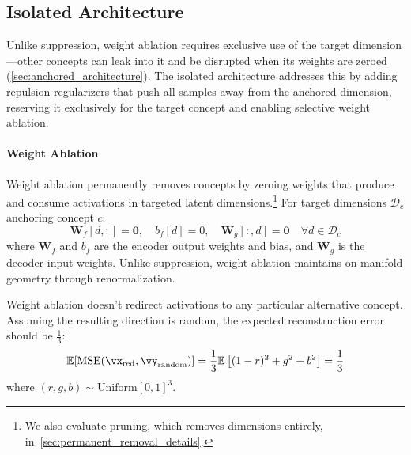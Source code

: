 %

\subsection{Isolated Architecture}
\label{sec:isolated_architecture}

Unlike suppression, weight ablation requires exclusive use of the target dimension---other concepts can leak into it and be disrupted when its weights are zeroed (\cref{sec:anchored_architecture}). The isolated architecture addresses this by adding repulsion regularizers that push all samples away from the anchored dimension, reserving it exclusively for the target concept and enabling selective weight ablation.

\paragraph{Weight Ablation}
Weight ablation permanently removes concepts by zeroing weights that produce and consume activations in targeted latent dimensions.\footnote{We also evaluate pruning, which removes dimensions entirely, in~\cref{sec:permanent_removal_details}.} For target dimensions $\mathcal{D}_c$ anchoring concept $c$:
%
\begin{equation}
    \mathbf{W}_{f}[d, :] = \mathbf{0}, \quad b_{f}[d] = 0, \quad \mathbf{W}_{g}[:, d] = \mathbf{0} \quad \forall d \in \mathcal{D}_c \label{eq:ablation}
\end{equation}
%
where $\mathbf{W}_{f}$ and $b_{f}$ are the encoder output weights and bias, and $\mathbf{W}_{g}$ is the decoder input weights. Unlike suppression, weight ablation maintains on-manifold geometry through renormalization.

Weight ablation doesn't redirect activations to any particular alternative concept. Assuming the resulting direction is random, the expected reconstruction error should be $\frac{1}{3}$:
%
\begin{equation}
    \mathbb{E}[\text{MSE}(\vx_{\text{red}}, \vy_{\text{random}})] = \frac{1}{3}\mathbb{E}\left[(1 - r)^2 + g^2 + b^2\right] = \frac{1}{3} \label{eq:mse_random}
\end{equation}
%
where $(r,g,b) \sim \text{Uniform}[0,1]^3$.

